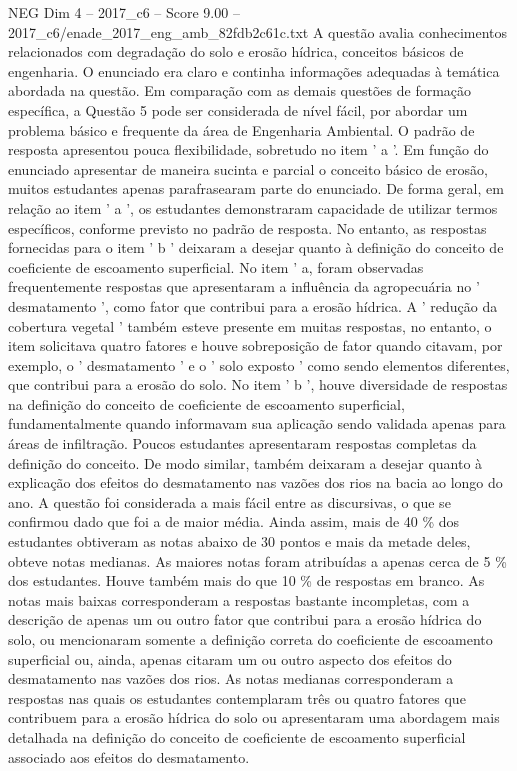 \begin{textsample}{NEG Dim 4 – 2017\_c6 – Score 9.00 – 2017\_c6/enade\_2017\_eng\_amb\_82fdb2c61c.txt}
A questão avalia conhecimentos relacionados com degradação do solo e erosão hídrica, conceitos básicos de engenharia.
O enunciado era claro e continha informações adequadas à temática abordada na questão.
Em comparação com as demais questões de formação específica, a Questão 5 pode ser considerada de nível fácil, por abordar um problema básico e frequente da área de Engenharia Ambiental.
O padrão de resposta apresentou pouca flexibilidade, sobretudo no item ' a '.
Em função do enunciado apresentar de maneira sucinta e parcial o conceito básico de erosão, muitos estudantes apenas parafrasearam parte do enunciado.
De forma geral, em relação ao item ' a ', os estudantes demonstraram capacidade de utilizar termos específicos, conforme previsto no padrão de resposta.
No entanto, as respostas fornecidas para o item ' b ' deixaram a desejar quanto à definição do conceito de coeficiente de escoamento superficial.
No item ' a, foram observadas frequentemente respostas que apresentaram a influência da agropecuária no ' desmatamento ', como fator que contribui para a erosão hídrica.
A ' redução da cobertura vegetal ' também esteve presente em muitas respostas, no entanto, o item solicitava quatro fatores e houve sobreposição de fator quando citavam, por exemplo, o ' desmatamento ' e o ' solo exposto ' como sendo elementos diferentes, que contribui para a erosão do solo.
No item ' b ', houve diversidade de respostas na definição do conceito de coeficiente de escoamento superficial, fundamentalmente quando informavam sua aplicação sendo validada apenas para áreas de infiltração.
Poucos estudantes apresentaram respostas completas da definição do conceito.
De modo similar, também deixaram a desejar quanto à explicação dos efeitos do desmatamento nas vazões dos rios na bacia ao longo do ano.
A questão foi considerada a mais fácil entre as discursivas, o que se confirmou dado que foi a de maior média.
Ainda assim, mais de 40 \% dos estudantes obtiveram as notas abaixo de 30 pontos e mais da metade deles, obteve notas medianas.
As maiores notas foram atribuídas a apenas cerca de 5 \% dos estudantes.
Houve também mais do que 10 \% de respostas em branco.
As notas mais baixas corresponderam a respostas bastante incompletas, com a descrição de apenas um ou outro fator que contribui para a erosão hídrica do solo, ou mencionaram somente a definição correta do coeficiente de escoamento superficial ou, ainda, apenas citaram um ou outro aspecto dos efeitos do desmatamento nas vazões dos rios.
As notas medianas corresponderam a respostas nas quais os estudantes contemplaram três ou quatro fatores que contribuem para a erosão hídrica do solo ou apresentaram uma abordagem mais detalhada na definição do conceito de coeficiente de escoamento superficial associado aos efeitos do desmatamento.

\end{textsample}

